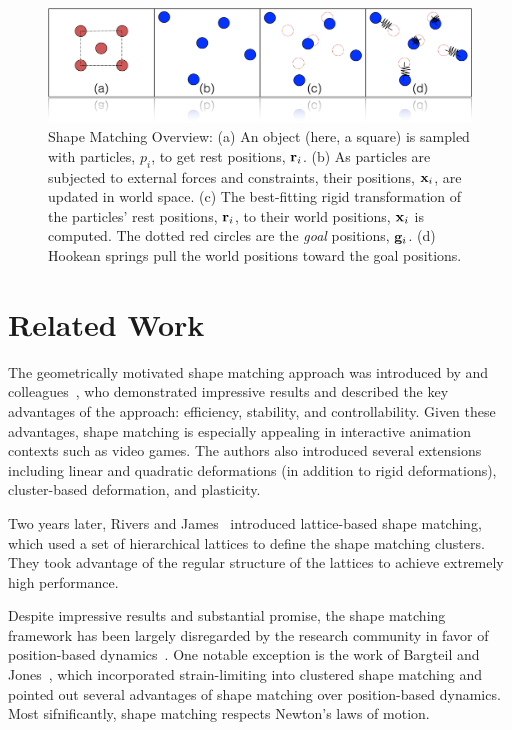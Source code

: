 \documentclass[review]{acmsiggraph}
\begin{document}
\begin{figure}
\includegraphics[width=\linewidth]{Figures/shapematching.png}
\caption{Shape Matching Overview: (a) An object (here, a square) is sampled with particles, $p_i$, to get rest positions, $\mathit{\mathbf{r}}_i$.  
(b) As particles are subjected to external forces and constraints, their positions, $\mathit{\mathbf{x}}_i$, are updated in world space.  
(c)  The best-fitting rigid transformation of the particles' rest positions, $\mathit{\mathbf{r}}_i$, 
to their world positions, $\mathit{\mathbf{x}}_i$ is computed.  The dotted red circles are the {\em goal} positions, $\mathit{\mathbf{g}}_i$.  
(d) Hookean springs pull the world positions toward the goal positions.}
\label{fig:shapematching}
\end{figure}

\section{Related Work}
The geometrically motivated shape matching approach was introduced by \Mueller and 
colleagues~, who demonstrated impressive results and 
described the key advantages of the approach: efficiency, stability, and controllability.
Given these advantages, shape matching is especially appealing in interactive animation contexts such as
video games.  The authors also introduced several extensions including linear and quadratic deformations 
(in addition to rigid deformations), cluster-based deformation, and plasticity.  

Two years later, Rivers and James~ introduced lattice-based shape matching,
which used a set of hierarchical lattices to define the shape matching clusters.  They took advantage
of the regular structure of the lattices to achieve extremely high performance.  

Despite impressive results and substantial promise,
the shape matching framework has been largely disregarded by the research community in favor of position-based
dynamics~\cite{Mueller:2007:PBD,Bender:2013:PBM,Bender:2014:ASO,Macklin:2014:UPP}.  One notable exception is
the work of Bargteil and Jones~, which incorporated strain-limiting into clustered shape matching
and pointed out several advantages of shape matching over position-based dynamics.  Most sifnificantly, shape matching respects Newton's 
laws of motion.
\end{document}
